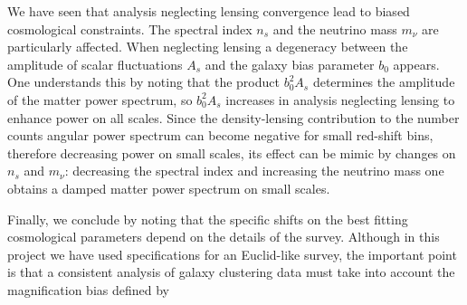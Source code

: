 We have seen that analysis neglecting lensing convergence lead to biased cosmological constraints. The spectral index $n_s$ and the neutrino mass $m_\nu$ are particularly affected. When neglecting lensing a degeneracy between the amplitude of scalar fluctuations $A_s$ and the galaxy bias parameter $b_0$ appears. One understands this by noting that the product $b_0^2 A_s$ determines the amplitude of the matter power spectrum, so $b_0^2 A_s$ increases in analysis neglecting lensing to enhance power on all scales. Since the density-lensing contribution to the number counts angular power spectrum can become negative for small red-shift bins, therefore decreasing power on small scales, its effect can be mimic by changes on $n_s$ and $m_\nu$: decreasing the spectral index and increasing the neutrino mass one obtains a damped matter power spectrum on small scales.

Finally, we conclude by noting that the specific shifts on the best fitting cosmological parameters depend on the details of the survey. Although in this project we have used specifications for an Euclid-like survey, the important point is that a consistent analysis of galaxy clustering data must take into account the magnification bias defined by      


